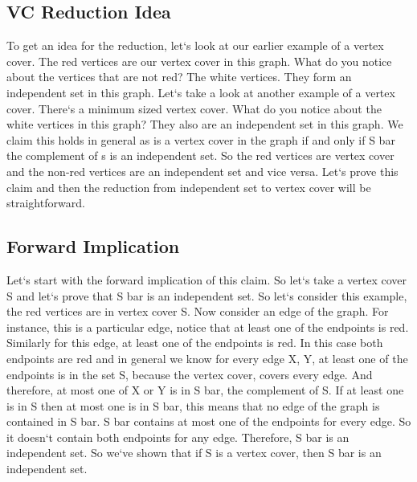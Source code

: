 \subsection{VC  Reduction Idea}
To get an idea for the reduction, let`s look at our earlier example of a vertex cover.
The red vertices are our vertex cover in this graph.
What do you notice about the vertices that are not red? The white vertices.
They form an independent set in this graph.
Let`s take a look at another example of a vertex cover.
There`s a minimum sized vertex cover.
What do you notice about the white vertices in this graph? They also are an independent set in this graph.
We claim this holds in general as is a vertex cover in the graph if and only if S bar the complement of s is an independent set.
So the red vertices are vertex cover and the non-red vertices are an independent set and vice versa.
Let`s prove this claim and then the reduction from independent set to vertex cover will be straightforward.

\subsection{Forward Implication}
Let`s start with the forward implication of this claim.
So let`s take a vertex cover S and let`s prove that S bar is an independent set.
So let`s consider this example, the red vertices are in vertex cover S\@.
Now consider an edge of the graph.
For instance, this is a particular edge, notice that at least one of the endpoints is red.
Similarly for this edge, at least one of the endpoints is red.
In this case both endpoints are red and in general we know for every edge X, Y, at least one of the endpoints is in the set S, because the vertex cover, covers every edge.
And therefore, at most one of X or Y is in S bar, the complement of S\@.
If at least one is in S then at most one is in S bar, this means that no edge of the graph is contained in S bar.
S bar contains at most one of the endpoints for every edge.
So it doesn`t contain both endpoints for any edge.
Therefore, S bar is an independent set.
So we`ve shown that if S is a vertex cover, then S bar is an independent set.

